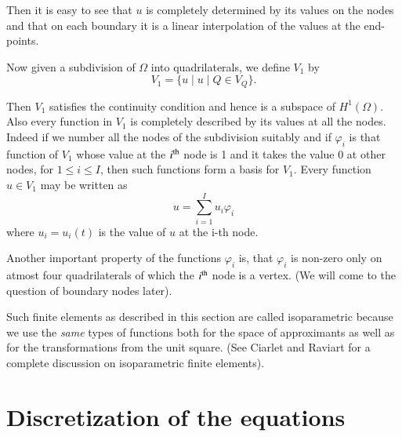 Then it is easy to see that $u$ is completely determined by its values on the nodes and that on each boundary it is a linear interpolation of the values at the end-points. 

Now given a subdivision of $\Omega$ into quadrilaterals, we define $V_1$ by 
\begin{equation*}
V_1 = \{u \mid u \mid Q \in V_Q\}. \tag{11.14}\label{eq11.14}
\end{equation*}

Then $V_1$ satisfies the continuity condition and hence is a subspace
of $H^1(\Omega)$. Also every function in $V_1$ is completely
described by its values at all the nodes. Indeed if we number all the
nodes of the subdivision suitably and if $\varphi_i$ is that function
of $V_1$ whose value at the $i^{\rm th}$ node is 1 and it  takes the
value 0 at other nodes, for $1 \leq i \leq I$, then such functions
form a basis for $V_1$. Every function $u \in V_1$ may be written as  
\begin{equation*}
u = \sum\limits^I_{i =1} u_i \varphi_i
\tag{11.15}\label{eq11.15}
\end{equation*}
where $u_i = u_i(t)$ is the value of $u$ at the i-th node.

Another important property of the functions $\varphi_i$ is, that $\varphi_i$ is non-zero only on atmost  four quadrilaterals of which the $i^{\rm th}$ node is a vertex. (We will come to the question of boundary nodes later).

Such finite elements as described in this section are called
isoparametric because we use the {\em same} types of functions both
for the space of approximants as well as for the transformations from
the unit square. (See Ciarlet and Raviart \cite{key7} for a complete
discussion on isoparametric finite elements). 

\section{Discretization of the equations}\label{chap11:sec11.4}

